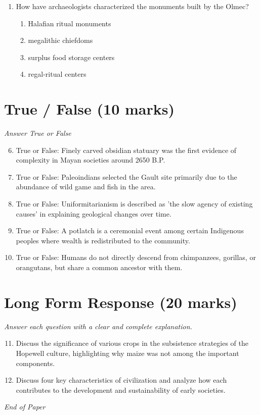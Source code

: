 \documentclass[12pt]{article}
\begin{document}
\begin{enumerate}[label=\arabic*.]
\begin{enumerate}[label=(\alph*)]
    \item greater regional differentiation
    \item active trading between the North and South
\end{enumerate}
\item How have archaeologists characterized the monuments built by the Olmec?
\begin{enumerate}[label=(\alph*)]
    \item Halafian ritual monuments
    \item megalithic chiefdoms
    \item surplus food storage centers
    \item regal-ritual centers
\end{enumerate}
\end{enumerate}

\section*{True / False (10 marks)}
\textit{Answer True or False}
\begin{enumerate}[label=\arabic*.]
\setcounter{enumi}{5}
\item True or False: Finely carved obsidian statuary was the first evidence of complexity in Mayan societies around 2650 B.P.
\item True or False: Paleoindians selected the Gault site primarily due to the abundance of wild game and fish in the area.
\item True or False: Uniformitarianism is described as 'the slow agency of existing causes' in explaining geological changes over time.
\item True or False: A potlatch is a ceremonial event among certain Indigenous peoples where wealth is redistributed to the community.
\item True or False: Humans do not directly descend from chimpanzees, gorillas, or orangutans, but share a common ancestor with them.
\end{enumerate}

\section*{Long Form Response (20 marks)}
\textit{Answer each question with a clear and complete explanation.}
\begin{enumerate}[label=\arabic*.]
\setcounter{enumi}{10}
\item Discuss the significance of various crops in the subsistence strategies of the Hopewell culture, highlighting why maize was not among the important components.
\item Discuss four key characteristics of civilization and analyze how each contributes to the development and sustainability of early societies.
\end{enumerate}

\vfill
\noindent\textit{End of Paper}
\end{document}
